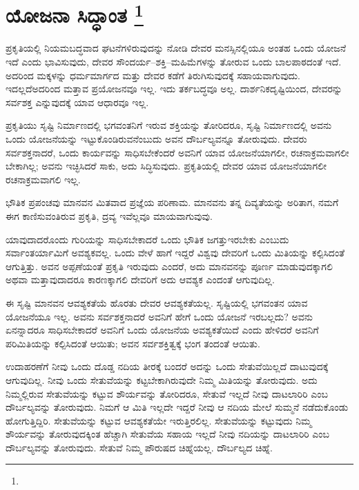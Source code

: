 
\vspace{-0.4cm}

\chapter[ಯೋಜನಾ ಸಿದ್ಧಾಂತ ]{ಯೋಜನಾ ಸಿದ್ಧಾಂತ \protect\footnote{}}

ಪ್ರಕೃತಿಯಲ್ಲಿ ನಿಯಮಬದ್ಧವಾದ ಘಟನೆಗಳಿರುವುದನ್ನು ನೋಡಿ ದೇವರ ಮನಸ್ಸಿನಲ್ಲಿಯೂ ಅಂತಹ ಒಂದು ಯೋಜನೆ ಇದೆ ಎಂದು ಭಾವಿಸುವುದು, ದೇವರ ಸೌಂದರ್ಯ–ಶಕ್ತಿ–ಮಹಿಮೆಗಳನ್ನು ತೋರುವ ಒಂದು ಬಾಲಪಾಠದಂತೆ ಇದೆ. ಅದರಿಂದ ಮಕ್ಕಳನ್ನು ಧರ್ಮಮಾರ್ಗದ ಮತ್ತು ದೇವರ ಕಡೆಗೆ ತಿರುಗಿಸುವುದಕ್ಕೆ ಸಹಾಯವಾಗುವುದು. ಇದಲ್ಲದೆ\break ಅದರಿಂದ ಮತ್ತಾವ ಪ್ರಯೋಜನವೂ ಇಲ್ಲ. ಇದು ತರ್ಕಬದ್ಧವೂ ಅಲ್ಲ. ದಾರ್ಶನಿಕ\break ದೃಷ್ಟಿಯಿಂದ, ದೇವರನ್ನು ಸರ್ವಶಕ್ತ ಎನ್ನುವುದಕ್ಕೆ ಯಾವ ಆಧಾರವೂ ಇಲ್ಲ.

\vskip 6pt

ಪ್ರಕೃತಿಯು ಸೃಷ್ಟಿ ನಿರ್ಮಾಣದಲ್ಲಿ ಭಗವಂತನಿಗೆ ಇರುವ ಶಕ್ತಿಯನ್ನು ತೋರಿದರೂ, ಸೃಷ್ಟಿ ನಿರ್ಮಾಣದಲ್ಲಿ ಅವನು ಒಂದು ಯೋಜನೆಯನ್ನು ಇಟ್ಟುಕೊಂಡಿರುವನೆಂಬುದು ಅವನ ದೌರ್ಬಲ್ಯವನ್ನೂ ತೋರುವುದು. ದೇವರು ಸರ್ವಶಕ್ತನಾದರೆ, ಒಂದು ಕಾರ್ಯವನ್ನು ಸಾಧಿಸಬೇಕೆಂದರೆ ಅವನಿಗೆ ಯಾವ ಯೋಜನೆಯಾಗಲೀ, ರಚನಾಕ್ರಮವಾಗಲೀ ಬೇಕಾಗಿಲ್ಲ; ಅವನು ಇಚ್ಛಿಸಿದರೆ ಸಾಕು, ಅದು ಸಿದ್ಧಿಸುವುದು. ಪ್ರಕೃತಿಯಲ್ಲಿ ದೇವರ ಯಾವ ಯೋಜನೆಯಾಗಲೀ ರಚನಾಕ್ರಮವಾಗಲಿ ಇಲ್ಲ.

\vskip 6pt

ಭೌತಿಕ ಪ್ರಪಂಚವು ಮಾನವನ ಮಿತವಾದ ಪ್ರಜ್ಞೆಯ ಪರಿಣಾಮ. ಮಾನವನು ತನ್ನ ದಿವ್ಯತೆಯನ್ನು ಅರಿತಾಗ, ನಮಗೆ ಈಗ ಕಾಣಿಸುವಂತಿರುವ ಪ್ರಕೃತಿ, ದ್ರವ್ಯ ಇವೆಲ್ಲವೂ ಮಾಯವಾಗುವುವು.

\vskip 5pt

ಯಾವುದಾದರೊಂದು ಗುರಿಯನ್ನು ಸಾಧಿಸಬೇಕಾದರೆ ಒಂದು ಭೌತಿಕ ಜಗತ್ತು\break ಇರಬೇಕು ಎಂಬುದು ಸರ್ವಾಂತರ್ಯಾಮಿಗೆ ಅವಶ್ಯಕವಲ್ಲ. ಒಂದು ವೇಳೆ ಹಾಗೆ ಇದ್ದರೆ ವಿಶ್ವವು ದೇವರಿಗೆ ಒಂದು ಮಿತಿಯನ್ನು ಕಲ್ಪಿಸಿದಂತೆ ಆಗುತ್ತಿತ್ತು. ಅವನ ಅಪ್ಪಣೆಯಂತೆ ಪ್ರಕೃತಿ ಇರುವುದು ಎಂದರೆ, ಅದು ಮಾನವನನ್ನು ಪೂರ್ಣ ಮಾಡುವುದಕ್ಕಾಗಲಿ ಅಥವಾ ಮತ್ತಾವುದಾದರೂ ಕಾರಣಕ್ಕಾಗಲಿ ದೇವರಿಗೆ ಅದು ಆವಶ್ಯಕ ಎಂದಂತೆ ಆಗುವುದಿಲ್ಲ.

\vskip 5pt

ಈ ಸೃಷ್ಟಿ ಮಾನವನ ಆವಶ್ಯಕತೆಯೆ ಹೊರತು ದೇವರ ಆವಶ್ಯಕತೆಯಲ್ಲ. ಸೃಷ್ಟಿಯಲ್ಲಿ ಭಗವಂತನ ಯಾವ ಯೋಜನೆಯೂ ಇಲ್ಲ. ಅವನು ಸರ್ವಶಕ್ತನಾದರೆ ಅವನಿಗೆ ಹೇಗೆ ಒಂದು ಯೋಜನೆ ಇರಬಲ್ಲದು? ಅವನು ಏನನ್ನಾದರೂ ಸಾಧಿಸಬೇಕಾದರೆ ಅವನಿಗೆ ಒಂದು ಯೋಜನೆಯ ಅವಶ್ಯಕತೆಯಿದೆ ಎಂದು ಹೇಳಿದರೆ ಅವನಿಗೆ ಪರಿಮಿತಿಯನ್ನು ಕಲ್ಪಿಸಿದಂತೆ ಆಯಿತು; ಅವನ ಸರ್ವಶಕ್ತಿತ್ವಕ್ಕೆ ಭಂಗ ತಂದಂತೆ ಆಯಿತು.

\vskip 5pt

ಉದಾಹರಣೆಗೆ ನೀವು ಒಂದು ದೊಡ್ಡ ನದಿಯ ತೀರಕ್ಕೆ ಬಂದರೆ ಅದನ್ನು ಒಂದು ಸೇತುವೆಯಿಲ್ಲದೆ ದಾಟುವುದಕ್ಕೆ ಆಗುವುದಿಲ್ಲ. ನೀವು ಒಂದು ಸೇತುವೆಯನ್ನು ಕಟ್ಟಬೇಕಾಗಿರುವುದೇ ನಿಮ್ಮ ಮಿತಿಯನ್ನು ತೋರುವುದು. ಅದು ನಿಮ್ಮಲ್ಲಿರುವ ಸೇತುವೆಯನ್ನು ಕಟ್ಟುವ ಶೌರ್ಯವನ್ನು ತೋರಿದರೂ, ಸೇತುವೆ ಇಲ್ಲದೆ ನೀವು ದಾಟಲಾರಿರಿ ಎಂಬ ದೌರ್ಬಲ್ಯವನ್ನು ತೋರುವುದು. ನಿಮಗೆ ಆ ಮಿತಿ ಇಲ್ಲದೇ ಇದ್ದರೆ ನೀವು ಆ ನದಿಯ ಮೇಲೆ ಸುಮ್ಮನೆ ನಡೆದುಕೊಂಡು ಹೋಗುತ್ತಿದ್ದಿರಿ. ಸೇತುವೆಯನ್ನು ಕಟ್ಟುವ ಆವಶ್ಯಕತೆಯೇ ಇರುತ್ತಿರಲಿಲ್ಲ. ಸೇತುವೆಯನ್ನು ಕಟ್ಟುವುದು ನಿಮ್ಮ ಶೌರ್ಯವನ್ನು ತೋರುವುದಕ್ಕಿಂತ ಹೆಚ್ಚಾಗಿ ಸೇತುವೆಯ ಸಹಾಯ ಇಲ್ಲದೆ ನೀವು ನದಿಯನ್ನು ದಾಟಲಾರಿರಿ ಎಂಬ ದೌರ್ಬಲ್ಯವನ್ನು ತೋರುವುದು. ಸೇತುವೆ ನಿಮ್ಮ ಪೌರುಷದ ಚಿಹ್ನೆಯಲ್ಲ. ದೌರ್ಬಲ್ಯದ ಚಿಹ್ನೆ.

